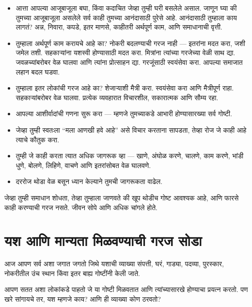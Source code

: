 \begin{itemize}
\item आत्ता आपल्या आजूबाजूला बघा, किंवा कदाचित जेव्हा तुम्ही घरी बसलेले असाल.  
जाणून घ्या की तुमच्या आजूबाजूला असलेले सर्व काही तुमच्या आनंदासाठी पुरेसे आहे.  
आनंदासाठी तुम्हाला काय लागतं? अन्न, निवारा, कपडे, इतर माणसे, काहीतरी अर्थपूर्ण काम, आणि समाधानाची वृत्ती.  

\item तुम्हाला अर्थपूर्ण काम करायचे आहे का? नोकरी बदलण्याची गरज नाही —  
इतरांना मदत करा, जशी जमेल तशी. सहकाऱ्यांना यशस्वी होण्यासाठी मदत करा.  
मित्रांना त्यांच्या गरजेच्या वेळी साथ द्या. जवळच्यांबरोबर वेळ घालवा आणि त्यांना प्रोत्साहन द्या.  
गरजूंसाठी स्वयंसेवा करा. आपल्या समाजात लहान बदल घडवा.  

\item तुम्हाला इतर लोकांची गरज आहे का? शेजाऱ्याशी मैत्री करा.  
स्वयंसेवा करा आणि मैत्रीपूर्ण राहा. सहकाऱ्यांबरोबर वेळ घालवा.  
प्रत्येक व्यवहारात विचारशील, सकारात्मक आणि सौम्य रहा.  

\item आपल्या आशीर्वादांची गणना सुरू करा — म्हणजे तुमच्याकडे आभारी होण्यासारख्या सर्व गोष्टी.  

\item जेव्हा तुम्ही स्वतःला “मला आणखी हवे आहे” असे विचार करताना सापडता,  
तेव्हा रोज जे काही आहे त्याचे कौतुक करा.  

\item तुम्ही जे काही करता त्यात अधिक जागरूक व्हा — खाणे, अंघोळ करणे, चालणे, काम करणे, भांडी धुणे, बोलणे, लिहिणे, वाचणे आणि इतरांसोबत वेळ घालवणे.  

\item दररोज थोडा वेळ बसून ध्यान केल्याने तुमची जागरूकता वाढेल.  
\end{itemize}

जेव्हा तुम्ही समाधान शोधता, तेव्हा तुम्हाला जाणवते की खूप थोडीच गोष्ट आवश्यक आहे,  
आणि फारसे काही करण्याची गरज नसते. जीवन सोपे आणि अधिक चांगले होते.


\chapter{यश आणि मान्यता मिळवण्याची गरज सोडा}

आज आपण सर्व अशा जगात जगतो जिथे यशाची व्याख्या 
संपत्ती, घरं, गाड्या, पदव्या, पुरस्कार, नोकरीतील उंच स्थान 
किंवा इतर बाह्य गोष्टींनी केली जाते. 

आपण सतत अशा लोकांकडे पाहतो जे या गोष्टी मिळवतात 
आणि त्यांच्यासारखे होण्याचा प्रयत्न करतो. 
पण खरे सांगायचे तर, यश म्हणजे काय? 
आणि ही व्याख्या कोण ठरवतो? 

